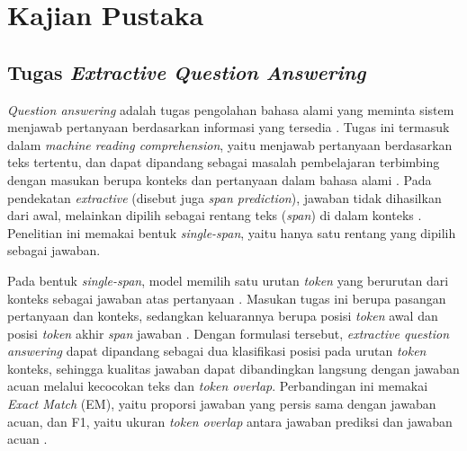 %
%
%

\chapter{Kajian Pustaka}

\section{Tugas \textit{Extractive Question Answering}}

\textit{Question answering} adalah tugas pengolahan bahasa alami yang meminta sistem menjawab pertanyaan berdasarkan informasi yang tersedia \parencite{jurafsky2025speech}. Tugas ini termasuk dalam \textit{machine reading comprehension}, yaitu menjawab pertanyaan berdasarkan teks tertentu, dan dapat dipandang sebagai masalah pembelajaran terbimbing dengan masukan berupa konteks dan pertanyaan dalam bahasa alami \parencite{wang2022extractive}. Pada pendekatan \textit{extractive} (disebut juga \textit{span prediction}), jawaban tidak dihasilkan dari awal, melainkan dipilih sebagai rentang teks (\textit{span}) di dalam konteks \parencite{jurafsky2025speech, wang2022extractive}. Penelitian ini memakai bentuk \textit{single-span}, yaitu hanya satu rentang yang dipilih sebagai jawaban.

Pada bentuk \textit{single-span}, model memilih satu urutan \textit{token} yang berurutan dari konteks sebagai jawaban atas pertanyaan \parencite{wang2022extractive}. Masukan tugas ini berupa pasangan pertanyaan dan konteks, sedangkan keluarannya berupa posisi \textit{token} awal dan posisi \textit{token} akhir \textit{span} jawaban \parencite{devlin2019bert}. Dengan formulasi tersebut, \textit{extractive question answering} dapat dipandang sebagai dua klasifikasi posisi pada urutan \textit{token} konteks, sehingga kualitas jawaban dapat dibandingkan langsung dengan jawaban acuan melalui kecocokan teks dan \textit{token overlap}. Perbandingan ini memakai \textit{Exact Match} (EM), yaitu proporsi jawaban yang persis sama dengan jawaban acuan, dan F1, yaitu ukuran \textit{token overlap} antara jawaban prediksi dan jawaban acuan \parencite{rajpurkar2016squad}.

